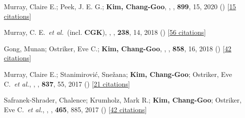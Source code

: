 \item[{39.}]Murray, Claire E.; Peek, J. E. G.; \textbf{Kim, Chang-Goo}, , \apj, \textbf{899}, 15, 2020 () [\href{http://adsabs.harvard.edu/abs/2020ApJ...899...15M}{15 citations}]

\item[{40.}]Murray, C. E.~\textit{et al.}~(incl. \textbf{CGK}), , \apjs, \textbf{238}, 14, 2018 () [\href{http://adsabs.harvard.edu/abs/2018ApJS..238...14M}{56 citations}]

\item[{41.}]Gong, Munan; Ostriker, Eve C.; \textbf{Kim, Chang-Goo}, , \apj, \textbf{858}, 16, 2018 () [\href{http://adsabs.harvard.edu/abs/2018ApJ...858...16G}{42 citations}]

\item[{42.}]Murray, Claire E.; Stanimirovi{\'c}, Sne{\v{z}}ana; \textbf{Kim, Chang-Goo}; Ostriker, Eve C.~\textit{et al.}, , \apj, \textbf{837}, 55, 2017 () [\href{http://adsabs.harvard.edu/abs/2017ApJ...837...55M}{21 citations}]

\item[{43.}]Safranek-Shrader, Chalence; Krumholz, Mark R.; \textbf{Kim, Chang-Goo}; Ostriker, Eve C.~\textit{et al.}, , \mnras, \textbf{465}, 885, 2017 () [\href{http://adsabs.harvard.edu/abs/2017MNRAS.465..885S}{42 citations}]